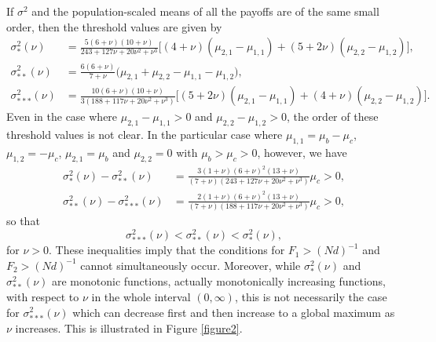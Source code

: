 \documentclass[11pt]{article}
\begin{document}
If $\sigma^2$ and the population-scaled means of all the payoffs are of the same small order, then the threshold values are given by
\begin{subequations}\label{sec5-case2-eq4}
\begin{align}
\sigma^2_{*}(\nu)&=\frac{5(6+\nu)(10+\nu)}{243+127\nu+20\nu^2+\nu^3}\Big[(4+\nu)(\mu_{2,1}-\mu_{1,1})+(5+2\nu)
(\mu_{2,2}-\mu_{1,2})\Big],\\
\sigma^2_{**}(\nu)&=\frac{6(6+\nu)}{7+\nu}\Big(\mu_{2,1}+\mu_{2,2}-\mu_{1,1}-\mu_{1,2}\Big),\\
\sigma^2_{***}(\nu)&=\frac{10(6+\nu)(10+\nu)}{3(188+117\nu+20\nu^2+\nu^3)}\Big[(5+2\nu)(\mu_{2,1}-\mu_{1,1})+(4+\nu)
(\mu_{2,2}-\mu_{1,2})\Big].
\end{align}
\end{subequations}
Even in the  case where $\mu_{2,1}-\mu_{1,1}>0$ and $\mu_{2,2}-\mu_{1,2}>0$, the order of these threshold values is not clear. In the particular case where
$\mu_{1,1}=\mu_b-\mu_c$, $\mu_{1,2}=-\mu_c$, $\mu_{2,1}=\mu_b$ and $\mu_{2,2}=0$ with $\mu_b>\mu_c>0$, however, we have
\begin{subequations}
\begin{align}
\sigma^2_{*}(\nu)-\sigma^2_{**}(\nu)&=\frac{3(1+\nu)(6+\nu)^2(13+\nu)}{(7+\nu)(243+127\nu+20\nu^2+\nu^3)}\mu_c>0,\\
 \sigma^2_{**}(\nu)-\sigma^2_{***}(\nu)&=\frac{2(1+\nu)(6+\nu)^2(13+\nu)}{(7+\nu)(188+117\nu+20\nu^2+\nu^3)}\mu_c>0,
\end{align}
\end{subequations}
so that
\begin{equation}
\sigma^2_{***}(\nu)<\sigma^2_{**}(\nu)<\sigma^2_{*}(\nu),
\end{equation}
for $\nu>0$. These inequalities imply that the conditions for $F_1>(Nd)^{-1}$ and $F_2>(Nd)^{-1}$ cannot simultaneously occur. Moreover, while $\sigma^2_{*}(\nu)$ and $\sigma^2_{**}(\nu)$ are monotonic functions, actually monotonically increasing functions, with respect to $\nu$ in the whole interval $(0, \infty)$, 
this is not necessarily the case for $\sigma^2_{***}(\nu)$ which can decrease first and then increase to a global maximum as $\nu$ increases. This is illustrated in Figure \ref{figure2}. 
\end{document}
